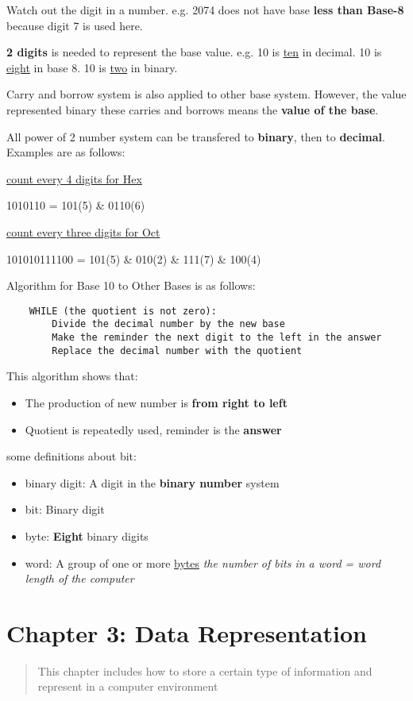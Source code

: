 \documentclass[12pt]{article}
\begin{document}
Watch out the digit in a number. e.g. 2074 does not have base \textbf{less than Base-8}
because digit 7 is used here.

\textbf{2 digits} is needed to represent the base value. e.g. 10 is \underline{ten} in decimal.
10 is \underline{eight} in base 8. 10 is \underline{two} in binary.

Carry and borrow system is also applied to other base system. However, the value represented binary
these carries and borrows means the \textbf{value of the base}.

All power of 2 number system can be transfered to \textbf{binary}, then to \textbf{decimal}.
Examples are as follows:
\begin{center}
\underline{count every 4 digits for Hex}

1010110 = 101(5) \& 0110(6)  

\underline{count every three digits for Oct}

101010111100 = 101(5) \& 010(2) \& 111(7) \& 100(4)
\end{center}

Algorithm for Base 10 to Other Bases is as follows:
\begin{lstlisting}
    WHILE (the quotient is not zero):
        Divide the decimal number by the new base
        Make the reminder the next digit to the left in the answer
        Replace the decimal number with the quotient
\end{lstlisting}    
This algorithm shows that:
\begin{itemize}
    \item The production of new number is \textbf{from right to left}    
    \item Quotient is repeatedly used, reminder is the \textbf{answer}
\end{itemize}

some definitions about bit:
\begin{itemize}
    \item binary digit: A digit in the \textbf{binary number} system
    \item bit: Binary digit
    \item byte: \textbf{Eight} binary digits
    \item word: A group of one or more \underline{bytes} \newline
    \emph{the number of bits in a word = word length of the computer}
\end{itemize}

\section{Chapter 3: Data Representation}
\begin{abstract}
This chapter includes how to store a certain type of information and represent in a computer environment
\end{abstract}
\end{document}
